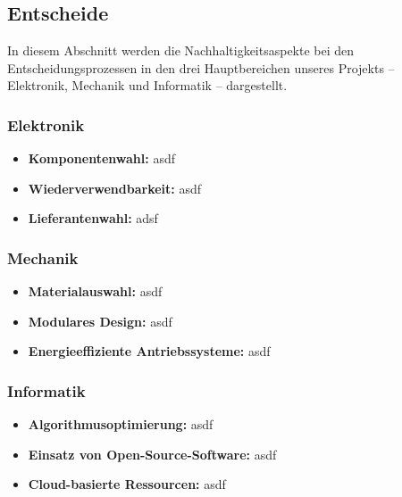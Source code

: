 \documentclass[../../main.tex]{subfiles} %
\begin{document}
\subsection{Entscheide}

In diesem Abschnitt werden die Nachhaltigkeitsaspekte bei den
Entscheidungsprozessen in den drei Hauptbereichen unseres Projekts –
Elektronik, Mechanik und Informatik – dargestellt.

\subsubsection{Elektronik}

\begin{itemize}
  \item \textbf{Komponentenwahl:} asdf
  \item \textbf{Wiederverwendbarkeit:} asdf
  \item \textbf{Lieferantenwahl:} adsf
\end{itemize}

\subsubsection{Mechanik}

\begin{itemize}
  \item \textbf{Materialauswahl:} asdf
  \item \textbf{Modulares Design:} asdf
  \item \textbf{Energieeffiziente Antriebssysteme:} asdf
\end{itemize}

\subsubsection{Informatik}

\begin{itemize}
  \item \textbf{Algorithmusoptimierung:} asdf
  \item \textbf{Einsatz von Open-Source-Software:} asdf
  \item \textbf{Cloud-basierte Ressourcen:} asdf
\end{itemize}
\end{document}
